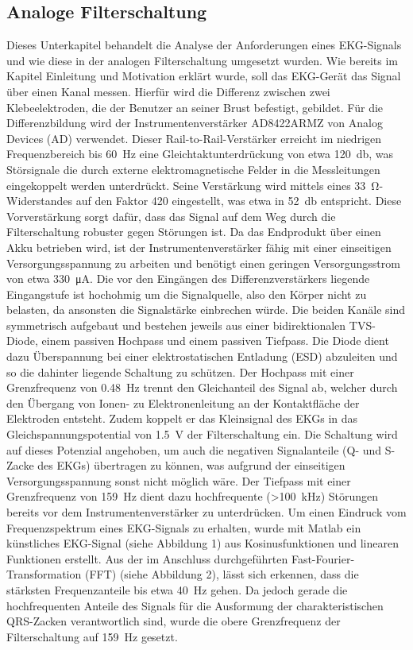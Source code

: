 
\subsection{Analoge Filterschaltung}

Dieses Unterkapitel behandelt die Analyse der Anforderungen eines EKG-Signals und wie diese in der analogen Filterschaltung umgesetzt wurden. Wie bereits im Kapitel Einleitung und Motivation erklärt wurde, soll das EKG-Gerät das Signal über einen Kanal messen. Hierfür wird die Differenz zwischen zwei Klebeelektroden, die der Benutzer an seiner Brust befestigt, gebildet. Für die Differenzbildung wird der Instrumentenverstärker AD8422ARMZ von Analog Devices (AD) verwendet. Dieser Rail-to-Rail-Verstärker erreicht im niedrigen Frequenzbereich bis \SI{60}{\hertz} eine Gleichtaktunterdrückung von etwa \SI{120}{\decibel}, was Störsignale die durch externe elektromagnetische Felder in die Messleitungen eingekoppelt werden unterdrückt. Seine Verstärkung wird mittels eines \SI{33}{\ohm}-Widerstandes auf den Faktor 420 eingestellt, was etwa in \SI{52}{\decibel} entspricht. Diese Vorverstärkung sorgt dafür, dass das Signal auf dem Weg durch die Filterschaltung robuster gegen Störungen ist. Da das Endprodukt über einen Akku betrieben wird, ist der Instrumentenverstärker fähig mit einer einseitigen Versorgungsspannung zu arbeiten und benötigt einen geringen Versorgungsstrom von etwa \SI{330}{\micro\ampere}. Die vor den Eingängen des Differenzverstärkers liegende Eingangstufe ist hochohmig um die Signalquelle, also den Körper nicht zu belasten, da ansonsten die Signalstärke einbrechen würde. Die beiden Kanäle sind symmetrisch aufgebaut und bestehen jeweils aus einer bidirektionalen TVS-Diode, einem passiven Hochpass und einem passiven Tiefpass. Die Diode dient dazu Überspannung bei einer elektrostatischen Entladung (ESD) abzuleiten und so die dahinter liegende Schaltung zu schützen. Der Hochpass mit einer Grenzfrequenz von \SI{0,48}{\hertz} trennt den Gleichanteil des Signal ab, welcher durch den Übergang von Ionen- zu Elektronenleitung an der Kontaktfläche der Elektroden entsteht. Zudem koppelt er das Kleinsignal des EKGs in das Gleichspannungspotential von \SI{1,5}{\volt} der Filterschaltung ein. Die Schaltung wird auf dieses Potenzial angehoben, um auch die negativen Signalanteile (Q- und S-Zacke des EKGs) übertragen zu können, was aufgrund der einseitigen Versorgungsspannung sonst nicht möglich wäre. Der Tiefpass mit einer Grenzfrequenz von \SI{159}{\hertz} dient dazu hochfrequente (>\SI{100}{\kilo\hertz}) Störungen bereits vor dem Instrumentenverstärker zu unterdrücken. Um einen Eindruck vom Frequenzspektrum eines EKG-Signals zu erhalten, wurde mit Matlab ein künstliches EKG-Signal (siehe Abbildung 1) aus Kosinusfunktionen und linearen Funktionen erstellt. Aus der im Anschluss durchgeführten Fast-Fourier-Transformation (FFT) (siehe Abbildung 2), lässt sich erkennen, dass die stärksten Frequenzanteile bis etwa \SI{40}{\hertz} gehen. Da jedoch gerade die hochfrequenten Anteile des Signals für die Ausformung der charakteristischen QRS-Zacken verantwortlich sind, wurde die obere Grenzfrequenz der Filterschaltung auf \SI{159}{\hertz} gesetzt. 

